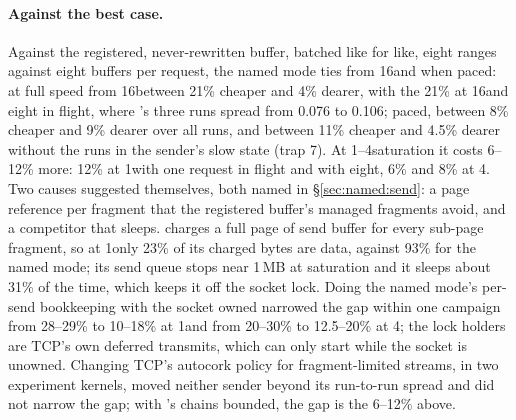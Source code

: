 \paragraph{Against the best case.} Against the registered, never-rewritten buffer, batched like
for like, eight ranges against eight buffers per request, the named mode ties from 16\KiB and
when paced: at full speed from 16\KiB between 21\% cheaper and 4\% dearer, with the 21\% at
16\KiB and eight in flight, where \sendzc's three runs spread from 0.076 to 0.106; paced,
between 8\% cheaper and 9\% dearer over all runs, and between 11\% cheaper and 4.5\% dearer
without the runs in the sender's slow state (trap 7). At 1--4\KiB saturation it costs 6--12\%
more: 12\% at 1\KiB with one request in flight and with eight, 6\% and 8\% at 4\KiB.
Two causes suggested themselves, both named in \S\ref{sec:named:send}: a page reference per fragment that
the registered buffer's managed fragments avoid, and a competitor that sleeps. \sendzc charges a
full page of send buffer for every sub-page fragment, so at 1\KiB only 23\% of its charged bytes
are data, against 93\% for the named mode; its send queue stops near 1\,MB at saturation and it
sleeps about 31\% of the time, which keeps it off the socket lock. %
Doing the named mode's per-send bookkeeping with the socket owned narrowed the gap within one
campaign from 28--29\% to 10--18\% at 1\KiB and from 20--30\% to 12.5--20\% at 4\KiB; the lock
holders are TCP's own deferred transmits, which can only start while the socket is unowned.
Changing TCP's autocork policy for fragment-limited streams, in two experiment kernels, moved
neither sender beyond its run-to-run spread and did not narrow the gap; with \sendzc's chains
bounded, the gap is the 6--12\% above. %

